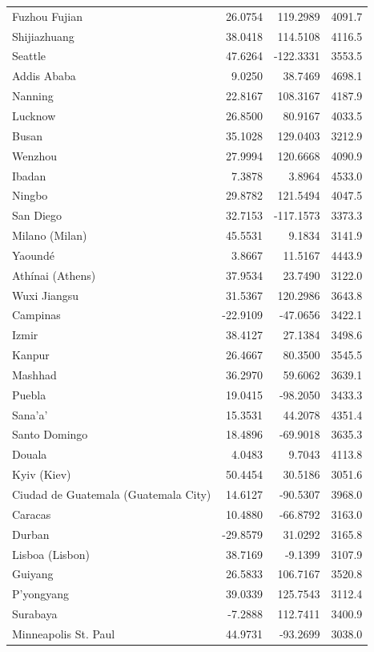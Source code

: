 \begin{longtable}{lrrc}
Fuzhou  Fujian & 26.0754 & 119.2989 & 4091.7 \\
Shijiazhuang & 38.0418 & 114.5108 & 4116.5 \\
Seattle & 47.6264 & -122.3331 & 3553.5 \\
Addis Ababa & 9.0250 & 38.7469 & 4698.1 \\
Nanning & 22.8167 & 108.3167 & 4187.9 \\
Lucknow & 26.8500 & 80.9167 & 4033.5 \\
Busan & 35.1028 & 129.0403 & 3212.9 \\
Wenzhou & 27.9994 & 120.6668 & 4090.9 \\
Ibadan & 7.3878 & 3.8964 & 4533.0 \\
Ningbo & 29.8782 & 121.5494 & 4047.5 \\
San Diego & 32.7153 & -117.1573 & 3373.3 \\
Milano (Milan) & 45.5531 & 9.1834 & 3141.9 \\
Yaoundé & 3.8667 & 11.5167 & 4443.9 \\
Athínai (Athens) & 37.9534 & 23.7490 & 3122.0 \\
Wuxi  Jiangsu & 31.5367 & 120.2986 & 3643.8 \\
Campinas & -22.9109 & -47.0656 & 3422.1 \\
Izmir & 38.4127 & 27.1384 & 3498.6 \\
Kanpur & 26.4667 & 80.3500 & 3545.5 \\
Mashhad & 36.2970 & 59.6062 & 3639.1 \\
Puebla & 19.0415 & -98.2050 & 3433.3 \\
Sana'a' & 15.3531 & 44.2078 & 4351.4 \\
Santo Domingo & 18.4896 & -69.9018 & 3635.3 \\
Douala & 4.0483 & 9.7043 & 4113.8 \\
Kyiv (Kiev) & 50.4454 & 30.5186 & 3051.6 \\
Ciudad de Guatemala (Guatemala City) & 14.6127 & -90.5307 & 3968.0 \\
Caracas & 10.4880 & -66.8792 & 3163.0 \\
Durban & -29.8579 & 31.0292 & 3165.8 \\
Lisboa (Lisbon) & 38.7169 & -9.1399 & 3107.9 \\
Guiyang & 26.5833 & 106.7167 & 3520.8 \\
P'yongyang & 39.0339 & 125.7543 & 3112.4 \\
Surabaya & -7.2888 & 112.7411 & 3400.9 \\
Minneapolis St. Paul & 44.9731 & -93.2699 & 3038.0 \\

\end{longtable}
